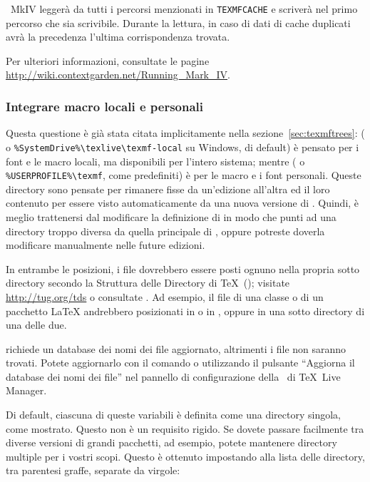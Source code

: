 \documentclass{article}
\begin{document}
\ConTeXt\ MkIV leggerà da tutti i percorsi menzionati in
\verb+TEXMFCACHE+ e scriverà nel primo percorso che sia scrivibile. Durante
la lettura, in caso di dati di cache duplicati avrà la precedenza l'ultima
corrispondenza trovata.

Per ulteriori informazioni, consultate le pagine
\url{http://wiki.contextgarden.net/Running_Mark_IV}.


\subsubsection{Integrare macro locali e personali}
\label{sec:local-personal-macros}

Questa questione è già stata citata implicitamente nella
sezione~\ref{sec:texmftrees}:
 ( o
\verb|%SystemDrive%\texlive\texmf-local| su Windows, di default) è pensato
per i font e le macro locali, ma disponibili per l'intero sistema; mentre
 ( o \verb|%USERPROFILE%\texmf|,
come predefiniti) è per le macro e i font personali.
Queste directory sono pensate per rimanere fisse da un'edizione all'altra
ed il loro contenuto per essere visto automaticamente da una nuova versione di 
\TL.
Quindi, è meglio trattenersi dal modificare la definizione di
 in modo che punti ad una directory troppo diversa da
quella principale di \TL, oppure potreste doverla modificare manualmente
nelle future edizioni.

In entrambe le posizioni, i file dovrebbero essere posti ognuno nella
propria sotto directory secondo la Struttura delle Directory di \TeX\
(\TDS); visitate \url{http://tug.org/tds} o consultate
. Ad esempio, il file di una
classe o di un pacchetto \LaTeX{} andrebbero posizionati in
 o in , oppure
in una sotto directory di una delle due.

 richiede un database dei nomi dei file aggiornato,
altrimenti i file non saranno trovati. Potete aggiornarlo con il comando
\cmdname{mktexlsr} o utilizzando il pulsante ``Aggiorna il database dei
nomi dei file'' nel pannello di configurazione della \GUI\ di \TeX\ Live
Manager.

Di default, ciascuna di queste variabili è definita come una directory
singola, come mostrato. Questo non è un requisito rigido. Se dovete passare
facilmente tra diverse versioni di grandi pacchetti, ad esempio, potete
mantenere directory multiple per i vostri scopi. Questo è ottenuto
impostando \dirname{TEXMFHOME} alla lista delle directory, tra parentesi
graffe, separate da virgole:
\end{document}
